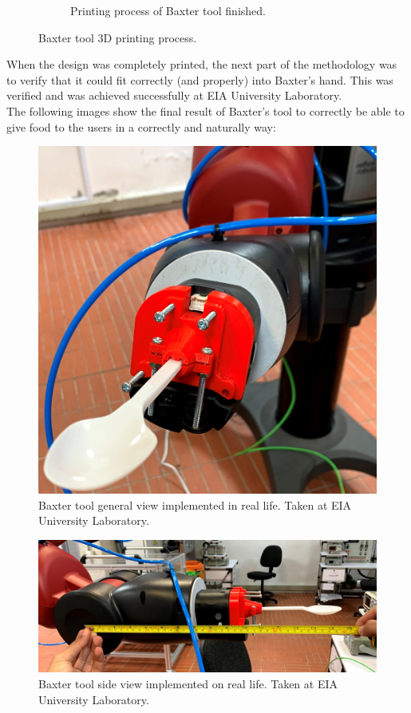 \documentclass[11pt]{report} %
\begin{document}
\begin{figure}[H]
\begin{subfigure}{.5\textwidth}
		\caption{Printing process of Baxter tool finished.}
		\label{fig_3d_prniter_in_action_2}
	\end{subfigure}%
	\caption{Baxter tool 3D printing process.}
	\label{fig_baxter_tool_printing_process}
\end{figure}


When the design was completely printed, the next part of the methodology was to verify that it could fit correctly (and properly) into Baxter's hand. This was verified and was achieved successfully at EIA University Laboratory.\\

The following images show the final result of Baxter's tool to correctly be able to give food to the users in a correctly and naturally way:

\begin{figure}[H]
    \centering
    \includegraphics[width=0.6\linewidth]{assets/imgs/baxter_robot/baxter_tool_real_life_implementation.jpg}
    \caption{Baxter tool general view implemented in real life. Taken at EIA University Laboratory.} 
    \label{fig_baxter_tool_real_life_general_view}
\end{figure}

\begin{figure}[H]
    \centering
    \includegraphics[width=0.8\linewidth]{assets/imgs/baxter_robot/baxter_tool_real_life_implementation_side_view.jpg}
    \caption{Baxter tool side view implemented on real life. Taken at EIA University Laboratory.} 
    \label{fig_baxter_tool_real_life_side_view}
\end{figure}
\end{document}
